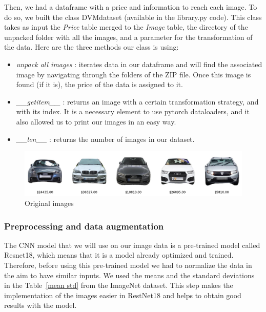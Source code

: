 \documentclass[12pt]{article}
\begin{document}
\noindent Then, we had a dataframe with a price and information to reach each image. To do so, we built the class DVMdataset (available in the library.py code). This class takes as input the \textit{Price} table merged to the \textit{Image} table, the directory of the unpacked folder with all the images, and a parameter for the transformation of the data. 
\noindent Here are the three methods our class is using: \\

\begin{itemize}
    \item \textit{unpack all images} : iterates data in our dataframe and will find the associated image by navigating through the folders of the ZIP file. Once this image is found (if it is), the price of the data is assigned to it.

    \item \textit{\_\_getitem\_\_} : returns an image with a certain transformation strategy, and with its index. It is a necessary element to use pytorch dataloaders, and it also allowed us to print our images in an easy way.
    
    \item \textit{\_\_len\_\_} : returns the number of images in our dataset.
\end{itemize}

\FloatBarrier
\begin{figure}[ht]
    \centering
    \label{table:images without transformations}
    \includegraphics[width=1\textwidth]{images without transformations.png}
    \caption{Original images}
\end{figure}
\FloatBarrier

\subsubsection{Preprocessing and data augmentation}
The CNN model that we will use on our image data is a pre-trained model called Resnet18, which means that it is a model already optimized and trained. Therefore, before using this pre-trained model we had to normalize the data in the aim to have similar inputs. We used the means and the standard deviations in the Table~\ref{mean std} from the ImageNet dataset. This step makes the implementation of the images easier in RestNet18 and helps to obtain good results with the model. 
\end{document}
